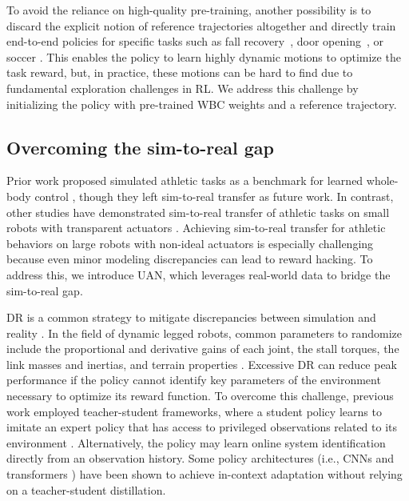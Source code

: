 To avoid the reliance on high-quality pre-training, another possibility is to discard the explicit notion of reference trajectories altogether and directly train end-to-end policies for specific tasks such as fall recovery~\cite{ma2022combining}, door opening~\cite{schwarke2023curiosity}, or soccer \cite{Haarnoja_2024, Ji2022Soccer, Ji2023DribbleBot}. This enables the policy to learn highly dynamic motions to optimize the task reward, but, in practice, these motions can be hard to find due to fundamental exploration challenges in RL. We address this challenge by initializing the policy with pre-trained WBC weights and a reference trajectory.

\subsection{Overcoming the sim-to-real gap}
Prior work proposed simulated athletic tasks as a benchmark for learned whole-body control \cite{sferrazza2024humanoidbenchsimulatedhumanoidbenchmark, luo2024smplolympics}, though they left sim-to-real transfer as future work. In contrast, other studies have demonstrated sim-to-real transfer of athletic tasks on small robots with transparent actuators \cite{Haarnoja_2024, Ji2022Soccer, Ji2023DribbleBot}. Achieving sim-to-real transfer for athletic behaviors on large robots with non-ideal actuators is especially challenging because even minor modeling discrepancies can lead to reward hacking. To address this, we introduce UAN, which leverages real-world data to bridge the sim-to-real gap.

DR is a common strategy to mitigate discrepancies between simulation and reality \cite{kumar2021rmarapidmotoradaptation, Lee_2020}. In the field of dynamic legged robots, common parameters to randomize include the proportional and derivative gains of each joint, the stall torques, the link masses and inertias, and terrain properties \cite{Lee_2020, zhang2024wococo}. Excessive DR can reduce peak performance if the policy cannot identify key parameters of the environment necessary to optimize its reward function. To overcome this challenge, previous work employed teacher-student frameworks, where a student policy learns to imitate an expert policy that has access to privileged observations related to its environment \cite{fu2023deep, kumar2021rmarapidmotoradaptation, Lee_2020}. Alternatively, the policy may learn online system identification directly from an observation history. Some policy architectures (i.e., CNNs \cite{li2024reinforcementlearningversatiledynamic} and transformers \cite{radosavovic2023realworldhumanoidlocomotionreinforcement}) have been shown to achieve in-context adaptation
without relying on a teacher-student distillation.


